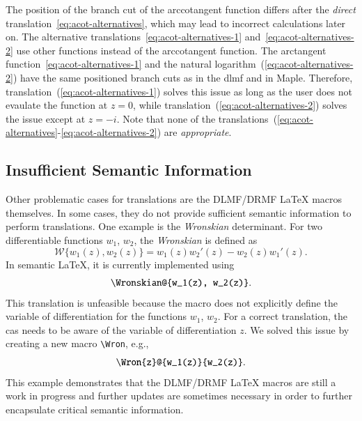 \documentclass[a4paper,11pt]{article}
\newcommand{\DLMF}{DLMF}
\newcommand{\DRMF}{DRMF}
\newcommand{\Maple}{Maple}
\newcommand{\Macro}{\DLMF/\DRMF{} \LaTeX{} macro}
\theoremstyle{defTheoStyle}
\theoremstyle{defExampStyle}
\DeclareRobustCommand{\iunit}{{i}}
\begin{document}
	\vspace{-0.2cm}
	The position of the branch cut of the arccotangent function differs after the {\it direct} translation~\eqref{eq:acot-alternatives}, which may lead to incorrect calculations later on. The alternative translations~\eqref{eq:acot-alternatives-1} and~\eqref{eq:acot-alternatives-2} use other functions instead of the arccotangent function. The arctangent function~\eqref{eq:acot-alternatives-1} and the natural logarithm~(\ref{eq:acot-alternatives-2}) have the same positioned branch cuts as in the \gls*{dlmf} and in \Maple. Therefore, translation~(\ref{eq:acot-alternatives-1}) solves this issue as long as the user does not evaulate the function at $z = 0$, while translation~(\ref{eq:acot-alternatives-2}) solves the issue except at $z=-\iunit$. Note that none of the translations~(\ref{eq:acot-alternatives}-\ref{eq:acot-alternatives-2}) are {\it appropriate}.
	
	\subsection{Insufficient Semantic Information}
	Other problematic cases for translations are the \Macro s themselves. In some cases, they do not provide sufficient semantic information to perform translations. One example is the \textit{Wronskian} determinant. For two differentiable functions $w_1$, $w_2$, the \textit{Wronskian} is defined as~\parencite[(1.13.4)]{NIST:DLMF}
	\begin{equation*}
		\mathscr{W}\{ w_1(z), w_2(z) \} = w_1(z)w_2'(z) - w_2(z)w_1'(z).
	\end{equation*}
	In semantic \LaTeX{}, it is currently implemented using
	\begin{equation}
	\verb|\Wronskian@{w_1(z), w_2(z)}|.
	\end{equation}
	This translation is unfeasible because the macro does not explicitly define the variable of differentiation for the functions $w_1$, $w_2$. For a correct translation, the \gls*{cas} needs to be aware of the variable of differentiation $z$. We solved this issue by creating a new macro \verb|\Wron|, e.g.,
	\begin{equation}
	\verb|\Wron{z}@{w_1(z)}{w_2(z)}|.
	\end{equation}
	This example demonstrates that the \Macro s are still a work in progress and further updates are sometimes
	necessary in order to further encapsulate critical semantic information.
	
\end{document}
